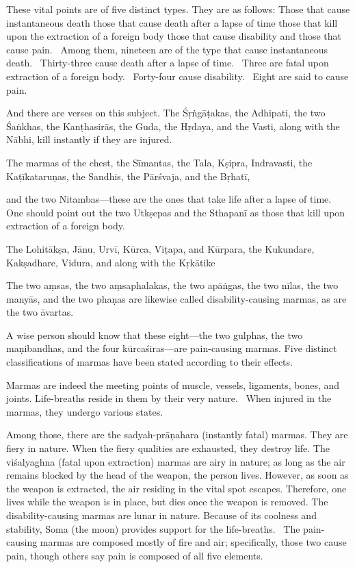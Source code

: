 \begin{translation}
\begin{tt}
\item[8]
These vital points are of five distinct types.
They are as follows:
Those that cause instantaneous death
those that cause death after a lapse of time
those that kill upon the extraction of a foreign body
those that cause disability
and those that cause pain. 
Among them, nineteen are of the type that cause instantaneous death. 
Thirty-three cause death after a lapse of time. 
Three are fatal upon extraction of a foreign body. 
Forty-four cause disability. 
Eight are said to cause pain. 


\item[9]
And there are verses on this subject.
The Śṛṅgāṭakas, the Adhipati, the two Śaṅkhas, the Kanṭhasirās, the Guda, the Hṛdaya, and the Vasti, along with the Nābhi, kill instantly if they are injured. 

\item[10]
The marmas of the chest, the Sīmantas, the Tala, Kṣipra, Indravasti, the Kaṭīkataruṇas, the Sandhis, the Pārśvaja, and the Bṛhatī,

\item[11]
and the two Nitambas—these are the ones that take life after a lapse of time. One should point out the two Utkṣepas and the Sthapanī as those that kill upon extraction of a foreign body.

\item[12]
The Lohitākṣa, Jānu, Urvī, Kūrca, Viṭapa, and Kūrpara, the Kukundare, Kakṣadhare, Vidura, and along with the Kṛkātike


\item[13]
The two aṃsas, the two aṃsaphalakas, the two apāṅgas, the two nīlas, the two manyās, and the two phaṇas are likewise called disability-causing marmas, as are the two āvartas.


\item[14]
A wise person should know that these eight—the two gulphas, the two maṇibandhas, and the four kūrcaśiras—are pain-causing marmas.
Five distinct classifications of marmas have been stated according to their effects.


\item[15]
Marmas are indeed the meeting points of muscle, vessels, ligaments, bones, and joints.
Life-breaths reside in them by their very nature.  When injured in the marmas, they undergo various states.


\item[16]
Among those, there are the sadyah-prāṇahara (instantly fatal) marmas.
They are fiery in nature.
When the fiery qualities are exhausted, they destroy life.
The viśalyaghna (fatal upon extraction) marmas are airy in nature; as long as the air remains blocked by the head of the weapon, the person lives.
However, as soon as the weapon is extracted, the air residing in the vital spot escapes.
Therefore, one lives while the weapon is in place, but dies once the weapon is removed.
The disability-causing marmas are lunar in nature.
Because of its coolness and stability, Soma (the moon) provides support for the life-breaths. 
The pain-causing marmas are composed mostly of fire and air; specifically, those two cause pain, though others say pain is composed of all five elements.



\end{tt}
\end{translation}
